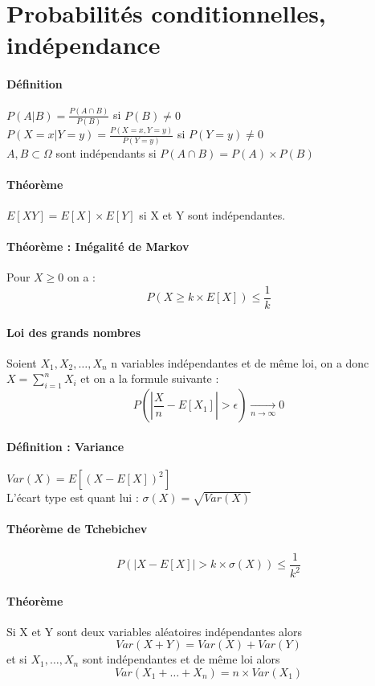 \documentclass[12pt,a4paper]{report}
\begin{document}
\section{Probabilités conditionnelles, indépendance}
\paragraph{Définition\\}
$ \displaystyle P(A|B)=\frac{P(A \cap B)}{P(B)} $ si $ P(B)\neq 0 $\\
$ \displaystyle P(X=x|Y=y)=\frac{P(X=x,Y=y)}{P(Y=y)} $ si $ P(Y=y) \neq 0 $\\
$A, B \subset \Omega $ sont indépendants si $ P(A \cap B) = P(A) \times P(B) $
\paragraph{Théorème\\}
$E[XY]=E[X]\times E[Y] $ si X et Y sont indépendantes.\\
\paragraph{Théorème : Inégalité de Markov\\}
Pour $X \geqslant 0$ on a : $$ P(X \geqslant k\times E[X]) \leqslant \frac{1}{k} $$
\paragraph{Loi des grands nombres\\}
Soient $X_1,X_2,\ldots, X_n $ n variables indépendantes et de même loi, on a donc $ X = \sum_{i=1}^{n} X_i $ et on a la formule suivante  : 
$$  P\left(\left|\frac{X}{n} - E[X_1]\right| > \epsilon \right) \underset{n\rightarrow \infty}{\longrightarrow} 0 $$
\paragraph{Définition : Variance\\}
$Var(X)=E \left[(X-E[X])^2\right] $\\
L'écart type est quant  lui : $\sigma(X) = \sqrt{Var(X)}$
\paragraph{Théorème de Tchebichev\\}
$$P\left(\left|X- E[X]\right| > k \times \sigma(X)\right) \leqslant \frac{1}{k^2} $$
\paragraph{Théorème\\}
Si X et Y sont deux variables aléatoires indépendantes alors $$ Var(X+Y)=Var(X)+Var(Y)$$ et si $X_1, \ldots ,X_n$ sont indépendantes et de même loi alors $$Var(X_1+\ldots+X_n)=n\times Var(X_1) $$
\end{document}
